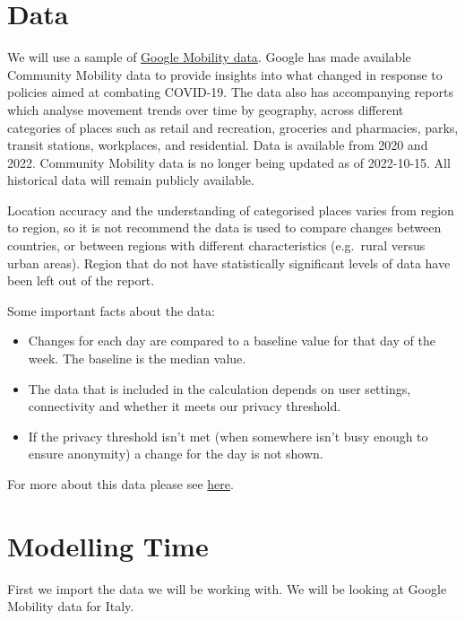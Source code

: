 \documentclass[
  letterpaper,
  DIV=11,
  numbers=noendperiod]{scrreprt}
\begin{document}
\hypertarget{data-3}{%
\section{Data}\label{data-3}}

We will use a sample of
\href{https://www.google.com/covid19/mobility/index.html?hl=en}{Google
Mobility data}. Google has made available Community Mobility data to
provide insights into what changed in response to policies aimed at
combating COVID-19. The data also has accompanying reports which analyse
movement trends over time by geography, across different categories of
places such as retail and recreation, groceries and pharmacies, parks,
transit stations, workplaces, and residential. Data is available from
2020 and 2022. Community Mobility data is no longer being updated as of
2022-10-15. All historical data will remain publicly available.

Location accuracy and the understanding of categorised places varies
from region to region, so it is not recommend the data is used to
compare changes between countries, or between regions with different
characteristics (e.g.~rural versus urban areas). Region that do not have
statistically significant levels of data have been left out of the
report.

Some important facts about the data:

\begin{itemize}
\item
  Changes for each day are compared to a baseline value for that day of
  the week. The baseline is the median value.
\item
  The data that is included in the calculation depends on user settings,
  connectivity and whether it meets our privacy threshold.
\item
  If the privacy threshold isn't met (when somewhere isn't busy enough
  to ensure anonymity) a change for the day is not shown.
\end{itemize}

For more about this data please see
\href{https://www.gstatic.com/covid19/mobility/2022-10-15_GB_Mobility_Report_en-GB.pdf}{here}.

\hypertarget{modelling-time}{%
\section{Modelling Time}\label{modelling-time}}

First we import the data we will be working with. We will be looking at
Google Mobility data for Italy.
\end{document}
